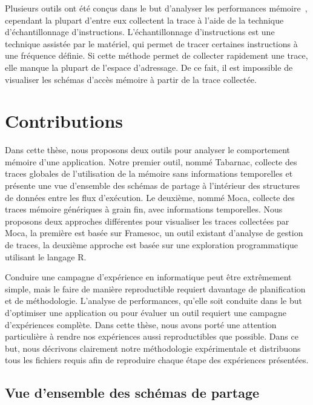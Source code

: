 Plusieurs outils ont été conçus dans le but d'analyser les performances mémoire~\cite{Lachaize12MemProf,Liu14Tool,Gimenez14Dissecting}, cependant la plupart d'entre eux collectent la trace à l'aide de la technique d'échantillonnage d'instructions.
L'échantillonnage d'instructions est une technique assistée par le matériel, qui permet de tracer certaines instructions à une fréquence\cite{Drongowski07Instructionbased,Levinthal09Performance} définie.
Si cette méthode permet de collecter rapidement une trace, elle manque la plupart de l'espace d'adressage.
De ce fait, il est impossible de visualiser les schémas d'accès mémoire à partir de la trace collectée.

\section*{Contributions}

Dans cette thèse, nous proposons deux outils pour analyser le comportement mémoire d'une application.
Notre premier outil, nommé \gls{Tabarnac}, collecte des traces globales de l'utilisation de la mémoire sans informations temporelles et présente une vue d'ensemble des schémas de partage à l'intérieur des structures de données entre les flux d'exécution.
Le deuxième, nommé \gls{Moca}, collecte des traces mémoire génériques à grain fin, avec informations temporelles.
Nous proposons deux approches différentes pour visualiser les traces collectées par \gls{Moca}, la première est basée sur \gls{Framesoc}, un outil existant d'analyse de gestion de traces, la deuxième approche est basée sur une exploration programmatique utilisant le langage R.

Conduire une campagne d'expérience en informatique peut être extrêmement simple, mais le faire de manière reproductible requiert davantage de planification et de méthodologie.
L'analyse de performances, qu'elle soit conduite dans le but d'optimiser une application ou pour évaluer un outil requiert une campagne d'expériences complète.
Dans cette thèse, nous avons porté une attention particulière à rendre nos expériences aussi reproductibles que possible.
Dans ce but, nous décrivons clairement notre méthodologie expérimentale et distribuons tous les fichiers requis afin de reproduire chaque étape des expériences présentées.

\subsection*{Vue d'ensemble des schémas de partage}

